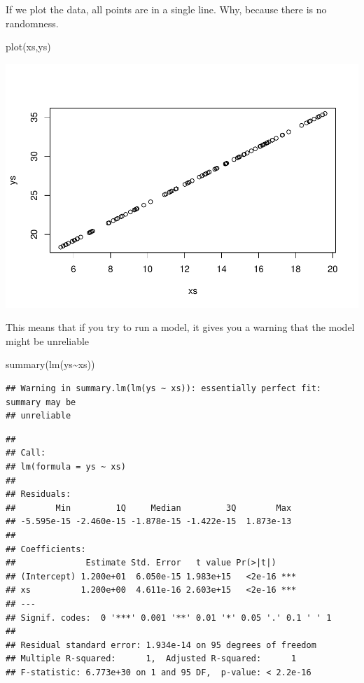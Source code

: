 \documentclass[
]{book}
\newenvironment{Shaded}{\begin{snugshade}}{\end{snugshade}}
\newcommand{\FunctionTok}[1]{\textcolor[rgb]{0.00,0.00,0.00}{#1}}
\newcommand{\NormalTok}[1]{#1}
\newcommand{\SpecialCharTok}[1]{\textcolor[rgb]{0.00,0.00,0.00}{#1}}
\begin{document}
If we plot the data, all points are in a single line. Why, because there is no randomness.

\begin{Shaded}
\begin{Highlighting}[]
\FunctionTok{plot}\NormalTok{(xs,ys)}
\end{Highlighting}
\end{Shaded}

\includegraphics{ECOMODbook_files/figure-latex/a6.23-1.pdf}

This means that if you try to run a model, it gives you a warning that the model might be unreliable

\begin{Shaded}
\begin{Highlighting}[]
\FunctionTok{summary}\NormalTok{(}\FunctionTok{lm}\NormalTok{(ys}\SpecialCharTok{\textasciitilde{}}\NormalTok{xs))}
\end{Highlighting}
\end{Shaded}

\begin{verbatim}
## Warning in summary.lm(lm(ys ~ xs)): essentially perfect fit: summary may be
## unreliable
\end{verbatim}

\begin{verbatim}
## 
## Call:
## lm(formula = ys ~ xs)
## 
## Residuals:
##        Min         1Q     Median         3Q        Max 
## -5.595e-15 -2.460e-15 -1.878e-15 -1.422e-15  1.873e-13 
## 
## Coefficients:
##              Estimate Std. Error   t value Pr(>|t|)    
## (Intercept) 1.200e+01  6.050e-15 1.983e+15   <2e-16 ***
## xs          1.200e+00  4.611e-16 2.603e+15   <2e-16 ***
## ---
## Signif. codes:  0 '***' 0.001 '**' 0.01 '*' 0.05 '.' 0.1 ' ' 1
## 
## Residual standard error: 1.934e-14 on 95 degrees of freedom
## Multiple R-squared:      1,  Adjusted R-squared:      1 
## F-statistic: 6.773e+30 on 1 and 95 DF,  p-value: < 2.2e-16
\end{verbatim}
\end{document}
